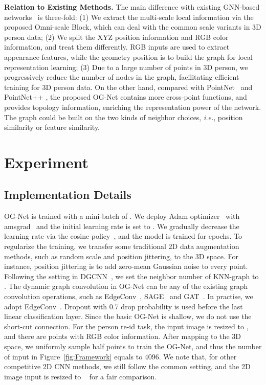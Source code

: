 \documentclass[journal]{IEEEtran}
\def\ie{\emph{i.e.}}
\begin{document}
\noindent\textbf{Relation to Existing Methods.} 
The main difference with existing GNN-based networks~\cite{wang2019dynamic,yang2018foldingnet} is three-fold: (1) We extract the multi-scale local information via the proposed Omni-scale Block, which can deal with the common scale variants in 3D person data; (2) We split the XYZ position information and RGB color information, and treat them differently. RGB inputs are used to extract appearance features, while the geometry position is to build the graph for local representation learning; (3) Due to a large number of points in 3D person, we progressively reduce the number of nodes in the graph, facilitating efficient training for 3D person data. 
On the other hand, compared with PointNet~\cite{qi2017pointnet} and PointNet++ \cite{qi2017pointnet++}, the proposed OG-Net contains more cross-point functions, and provides topology information, enriching the representation power of the network. The graph could be built on the two kinds of neighbor choices, \ie, position similarity or feature similarity.


\section{Experiment}
\subsection{Implementation Details}  OG-Net is trained with a mini-batch of . We deploy Adam optimizer~\cite{kingma2014adam} with amsgrad~\cite{reddi2019convergence} and the initial learning rate is set to . We gradually decrease the learning rate via the cosine policy~\cite{loshchilov2016sgdr}, and the model is trained for  epochs. To regularize the training, we transfer some traditional 2D data augmentation methods, such as random scale and position jittering, to the 3D space. For instance, position jittering is to add zero-mean Gaussian noise to every point. Following the setting in DGCNN~\cite{wang2019dynamic}, we set the neighbor number of KNN-graph to . The dynamic graph convolution in OG-Net can be any of the existing graph convolution operations, such as EdgeConv~\cite{wang2019dynamic}, SAGE~\cite{hamilton2017inductive} and GAT~\cite{xu2018powerful}. In practise, we adopt EdgeConv~\cite{wang2019dynamic}. Dropout with 0.7 drop probability is used before the last linear classification layer. Since the basic OG-Net is shallow, we do not use the short-cut connection. For the person re-id task, the input image is resized to , and there are  points with RGB color information. After mapping to the 3D space, we uniformly sample half points to train the OG-Net, and thus the number of input  in Figure~\ref{fig:Framework} equals to 4096. We note that, for other competitive 2D CNN methods, we still follow the common setting, and the 2D image input is resized to  ~\cite{sun2017beyond,zheng2019joint} for a fair comparison.  
\end{document}

